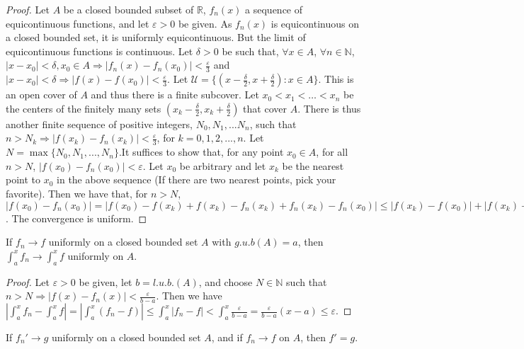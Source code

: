 \documentclass[crop=false,class=book,oneside]{standalone}
\begin{document}
            \begin{proof}
                Let $A$ be a closed bounded subset of $\mathbb{R}$, $f_n(x)$ a sequence of equicontinuous functions, and let $\varepsilon>0$ be given. As $f_n(x)$ is equicontinuous on a closed bounded set, it is uniformly equicontinuous. But the limit of equicontinuous functions is continuous. Let $\delta>0$ be such that, $\forall x\in A$, $\forall n\in\mathbb{N}$, $|x-x_0|<\delta, x_0\in A \Rightarrow |f_n(x)-f_n(x_0)|<\frac{\varepsilon}{3}$ and $|x-x_0|<\delta \Rightarrow |f(x)-f(x_0)|<\frac{\varepsilon}{3}$. Let $\mathcal{U} = \{(x-\frac{\delta}{2},x+\frac{\delta}{2}): x\in A\}$. This is an open cover of $A$ and thus there is a finite subcover. Let $x_0<x_1<\hdots<x_n$ be the centers of the finitely many sets $(x_k-\frac{\delta}{2},x_k+\frac{\delta}{2})$ that cover $A$. There is thus another finite sequence of positive integers, $N_0, N_1,... N_n$, such that $n>N_k \Rightarrow |f(x_k)-f_n(x_k)|<\frac{\varepsilon}{3}$, for $k=0,1,2,...,n$. Let $N= \max\{N_0, N_1, ..., N_n\}$.It suffices to show that, for any point $x_0 \in A$, for all $n>N$, $|f(x_0)-f_n(x_0)|<\varepsilon$. Let $x_0$ be arbitrary and let $x_k$ be the nearest point to $x_0$ in the above sequence (If there are two nearest points, pick your favorite). Then we have that, for $n>N$, $|f(x_0) - f_n(x_0)| = |f(x_0)-f(x_k)+f(x_k)-f_n(x_k)+f_n(x_k)-f_n(x_0)|\leq |f(x_k)-f(x_0)|+|f(x_k)-f_n(x_k)|+|f_n(x_k)-f_n(x_0)|<\varepsilon$. The convergence is uniform.
            \end{proof}
            \begin{theorem}
                If $f_n\rightarrow f$ uniformly on a closed bounded set $A$ with $g.u.b(A)=a$, then $\int_{a}^{x} f_n \rightarrow \int_{a}^{x} f$ uniformly on $A$.
            \end{theorem}
            \begin{proof}
                Let $\varepsilon >0$ be given, let $b=l.u.b.(A)$, and choose $N\in\mathbb{N}$ such that $n>N\Rightarrow |f(x)-f_n(x)|<\frac{\varepsilon}{b-a}$. Then we have $|\int_{a}^{x} f_n - \int_{a}^{x} f| = |\int_{a}^{x} (f_n-f)| \leq \int_{a}^{x} |f_n-f| < \int_{a}^{x} \frac{\varepsilon}{b-a}= \frac{\varepsilon}{b-a}(x-a) \leq \varepsilon$.
            \end{proof}
            \begin{theorem}
                If $f_n'\rightarrow g$ uniformly on a closed bounded set $A$, and if $f_n \rightarrow f$ on $A$, then $f'=g$.
            \end{theorem}
\end{document}
